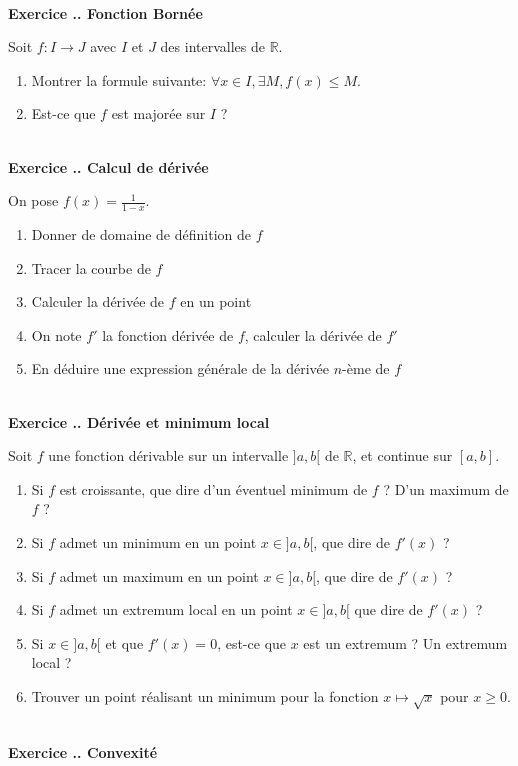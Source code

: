 \documentclass{article}
\newcommand{\mb}[1]{\mathbb{#1}}
\newcounter{exo}
\newcommand{\exercice}[1][\null]{\textbf{\\ Exercice \thesection.\theexo. #1} \addtocounter{exo}{1}}
\begin{document}
\exercice[Fonction Bornée]

Soit $f : I \to J$ avec $I$ et $J$ des intervalles de $\mb{R}$.

\begin{enumerate}
    \item Montrer la formule suivante: $\forall x \in I, \exists M, f(x) \leq
        M$.

    \item Est-ce que $f$ est majorée sur $I$ ?
\end{enumerate}

\exercice[Calcul de dérivée]

On pose $f(x) = \frac{1}{1-x}$.

\begin{enumerate}
    \item Donner de domaine de définition de $f$
    \item Tracer la courbe de $f$
    \item Calculer la dérivée de $f$ en un point
    \item On note $f'$ la fonction dérivée de $f$,
        calculer la dérivée de $f'$
    \item En déduire une expression générale 
        de la dérivée $n$-ème de $f$
\end{enumerate}


\exercice[Dérivée et minimum local]

Soit $f$ une fonction dérivable sur un intervalle $]a,b[$ de $\mb{R}$,
et continue sur $[a,b]$.

\begin{enumerate}
    \item Si $f$ est croissante, que dire d'un éventuel minimum de $f$ ? 
        D'un maximum de $f$ ?
    \item Si $f$ admet un minimum en un point $x \in ]a,b[$, 
        que dire de $f'(x)$ ?
    \item Si $f$ admet un maximum en un point $x \in ]a,b[$,
        que dire de $f'(x)$ ?
    \item Si $f$ admet un extremum local en un point $x \in ]a,b[$
        que dire de $f'(x)$ ?
    \item Si $x \in ]a,b[$ et que $f'(x) = 0$, est-ce que $x$
        est un extremum ? Un extremum local ?
    \item Trouver un point réalisant un
        minimum pour la fonction $x \mapsto \sqrt{x}$ pour $x \geq 0$.
\end{enumerate}

\exercice[Convexité]
\end{document}
